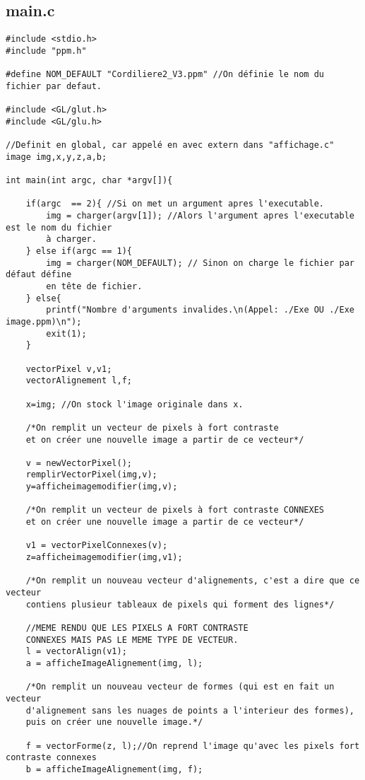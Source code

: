 \documentclass[a4paper , 10pt]{article}
\begin{document}
\subsection{main.c}
\begin{verbatim}
#include <stdio.h>
#include "ppm.h"

#define NOM_DEFAULT "Cordiliere2_V3.ppm" //On définie le nom du fichier par defaut.

#include <GL/glut.h>
#include <GL/glu.h>

//Definit en global, car appelé en avec extern dans "affichage.c"
image img,x,y,z,a,b; 

int main(int argc, char *argv[]){

    if(argc  == 2){ //Si on met un argument apres l'executable.
        img = charger(argv[1]); //Alors l'argument apres l'executable est le nom du fichier 
        à charger.
    } else if(argc == 1){
        img = charger(NOM_DEFAULT); // Sinon on charge le fichier par défaut défine 
        en tête de fichier.
    } else{
        printf("Nombre d'arguments invalides.\n(Appel: ./Exe OU ./Exe image.ppm)\n");
        exit(1);
    }

    vectorPixel v,v1;
	vectorAlignement l,f;

    x=img; //On stock l'image originale dans x.

    /*On remplit un vecteur de pixels à fort contraste
    et on créer une nouvelle image a partir de ce vecteur*/
    
    v = newVectorPixel();
    remplirVectorPixel(img,v);
    y=afficheimagemodifier(img,v);

    /*On remplit un vecteur de pixels à fort contraste CONNEXES
    et on créer une nouvelle image a partir de ce vecteur*/
    
    v1 = vectorPixelConnexes(v);
    z=afficheimagemodifier(img,v1);

    /*On remplit un nouveau vecteur d'alignements, c'est a dire que ce vecteur
    contiens plusieur tableaux de pixels qui forment des lignes*/
    
    //MEME RENDU QUE LES PIXELS A FORT CONTRASTE 
    CONNEXES MAIS PAS LE MEME TYPE DE VECTEUR.
   	l = vectorAlign(v1);
    a = afficheImageAlignement(img, l);

    /*On remplit un nouveau vecteur de formes (qui est en fait un vecteur 
    d'alignement sans les nuages de points a l'interieur des formes),
    puis on créer une nouvelle image.*/
    
    f = vectorForme(z, l);//On reprend l'image qu'avec les pixels fort contraste connexes
    b = afficheImageAlignement(img, f);


\end{verbatim}
\end{document}
